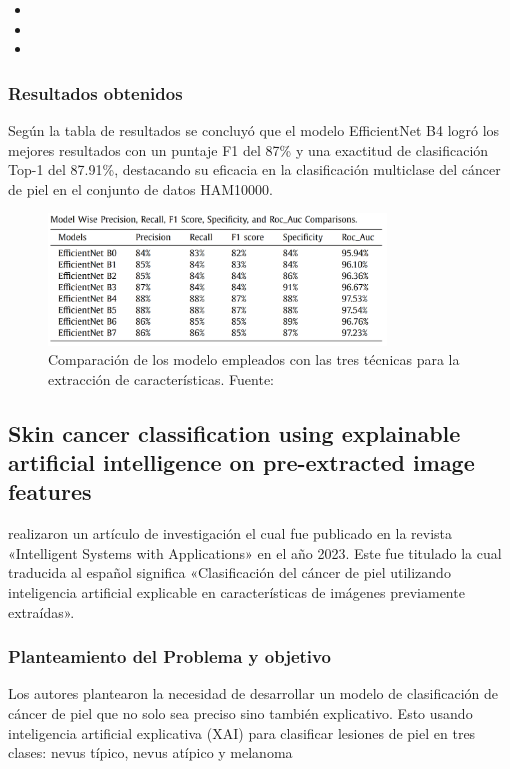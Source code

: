 \begin{itemize}
	\item \MEDMone
	\item \MEDMtwo
	\item \MEDMthree
	
\end{itemize}

\subsubsection{Resultados obtenidos}

Según la tabla de resultados se concluyó que  el modelo EfficientNet B4 logró los mejores resultados con un puntaje F1 del 87\% y una exactitud de clasificación Top-1 del 87.91\%, destacando su eficacia en la clasificación multiclase del cáncer de piel en el conjunto de datos HAM10000.

\begin{figure}[h]
	\begin{center}
		\includegraphics[width=0.8\textwidth]{2/figuras/Multiclass_skin_cancer_imagen_01.png}
		\caption{Comparación de los modelo empleados con las  tres técnicas para la extracción de características. Fuente: \cite{ali_2022multiclass}}
		\label{1:fig}
	\end{center}
\end{figure}

\subsection{Skin cancer classification using explainable artificial intelligence on pre-extracted image features \citep*{khater2023skin}}
\citeauthor{khater2023skin} realizaron un artículo de investigación el cual fue publicado en la revista «Intelligent Systems with Applications» en el año 2023. Este fue titulado  la cual traducida al español significa «Clasificación del cáncer de piel utilizando inteligencia artificial explicable en características de imágenes previamente extraídas».

\subsubsection{Planteamiento del Problema y objetivo}
Los autores plantearon la necesidad de desarrollar un modelo de clasificación de cáncer de piel que no solo sea preciso sino también explicativo. Esto usando inteligencia artificial explicativa (XAI) para clasificar lesiones de piel en tres clases: nevus típico, nevus atípico y melanoma


